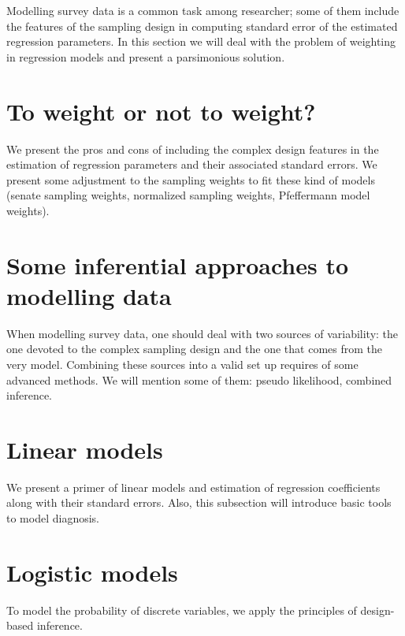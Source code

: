 \documentclass[
  12pt,
]{book}
\begin{document}
Modelling survey data is a common task among researcher; some of them include the features of the sampling design in computing standard error of the estimated regression parameters. In this section we will deal with the problem of weighting in regression models and present a parsimonious solution.

\hypertarget{to-weight-or-not-to-weight}{%
\section{To weight or not to weight?}\label{to-weight-or-not-to-weight}}

We present the pros and cons of including the complex design features in the estimation of regression parameters and their associated standard errors. We present some adjustment to the sampling weights to fit these kind of models (senate sampling weights, normalized sampling weights, Pfeffermann model weights).

\hypertarget{some-inferential-approaches-to-modelling-data}{%
\section{Some inferential approaches to modelling data}\label{some-inferential-approaches-to-modelling-data}}

When modelling survey data, one should deal with two sources of variability: the one devoted to the complex sampling design and the one that comes from the very model. Combining these sources into a valid set up requires of some advanced methods. We will mention some of them: pseudo likelihood, combined inference.

\hypertarget{linear-models}{%
\section{Linear models}\label{linear-models}}

We present a primer of linear models and estimation of regression coefficients along with their standard errors. Also, this subsection will introduce basic tools to model diagnosis.

\hypertarget{logistic-models}{%
\section{Logistic models}\label{logistic-models}}

To model the probability of discrete variables, we apply the principles of design-based inference.
\end{document}
